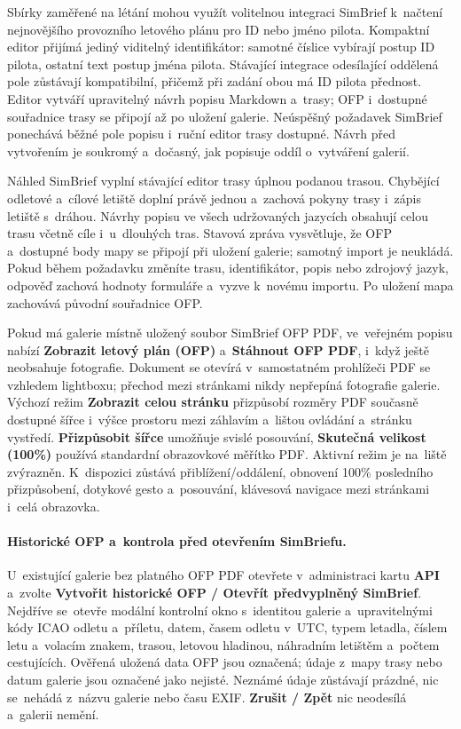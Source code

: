 \documentclass[11pt,a4paper]{article}
\newcommand{\ui}[1]{\textbf{#1}}
\begin{document}
Sbírky zaměřené na létání mohou využít volitelnou integraci SimBrief k~načtení
nejnovějšího provozního letového plánu pro ID nebo jméno pilota. Kompaktní
editor přijímá jediný viditelný identifikátor: samotné číslice vybírají postup
ID pilota, ostatní text postup jména pilota. Stávající integrace odesílající
oddělená pole zůstávají kompatibilní, přičemž při zadání obou má ID pilota
přednost. Editor vytváří upravitelný návrh popisu Markdown a~trasy; OFP
i~dostupné souřadnice trasy se připojí až po uložení galerie. Neúspěšný
požadavek SimBrief ponechává běžné pole popisu i~ruční editor trasy dostupné.
Návrh před vytvořením je soukromý a~dočasný, jak popisuje oddíl o~vytváření
galerií.

Náhled SimBrief vyplní stávající editor trasy úplnou podanou trasou. Chybějící
odletové a~cílové letiště doplní právě jednou a~zachová pokyny trasy i~zápis
letiště s~dráhou. Návrhy popisu ve všech udržovaných jazycích obsahují celou
trasu včetně cíle i~u~dlouhých tras. Stavová zpráva vysvětluje, že OFP
a~dostupné body mapy se připojí při uložení galerie; samotný import je neukládá.
Pokud během požadavku změníte trasu, identifikátor, popis nebo zdrojový jazyk,
odpověď zachová hodnoty formuláře a~vyzve k~novému importu. Po uložení mapa
zachovává původní souřadnice OFP.

Pokud má galerie místně uložený soubor SimBrief OFP PDF, ve~veřejném popisu
nabízí \ui{Zobrazit letový plán (OFP)} a~\ui{Stáhnout OFP PDF}, i~když ještě
neobsahuje fotografie. Dokument se otevírá v~samostatném prohlížeči PDF se
vzhledem lightboxu; přechod mezi stránkami nikdy nepřepíná fotografie galerie.
Výchozí režim \ui{Zobrazit celou stránku} přizpůsobí rozměry PDF současně
dostupné šířce i~výšce prostoru mezi záhlavím a~lištou ovládání a~stránku
vystředí. \ui{Přizpůsobit šířce} umožňuje svislé posouvání, \ui{Skutečná
velikost (100\%)} používá standardní obrazovkové měřítko PDF. Aktivní režim je
na~liště zvýrazněn. K~dispozici zůstává přiblížení/oddálení, obnovení 100\%
posledního přizpůsobení, dotykové gesto a~posouvání, klávesová navigace mezi
stránkami i~celá obrazovka.

\paragraph{Historické OFP a~kontrola před otevřením SimBriefu.}
U~existující galerie bez platného OFP PDF otevřete v~administraci kartu \ui{API}
a~zvolte \ui{Vytvořit historické OFP / Otevřít předvyplněný SimBrief}. Nejdříve
se~otevře modální kontrolní okno s~identitou galerie a~upravitelnými kódy ICAO
odletu a~příletu, datem, časem odletu v~UTC, typem letadla, číslem letu
a~volacím znakem, trasou, letovou hladinou, náhradním letištěm a~počtem
cestujících. Ověřená uložená data OFP jsou označená; údaje z~mapy trasy nebo
datum galerie jsou označené jako nejisté. Neznámé údaje zůstávají prázdné, nic
se~nehádá z~názvu galerie nebo času EXIF. \ui{Zrušit / Zpět} nic neodesílá
a~galerii nemění.
\end{document}

